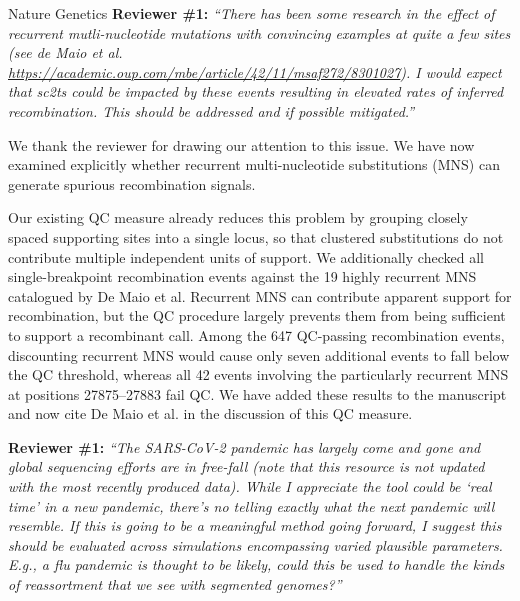 \documentclass{letter}
\begin{document}
\begin{letter}{Nature Genetics}
\noindent \textbf{Reviewer \#1:} \textit{``There has been some research in the effect
of recurrent mutli-nucleotide mutations with convincing examples at quite a
few sites (see de Maio et al.
\url{https://academic.oup.com/mbe/article/42/11/msaf272/8301027}). I would
expect that sc2ts could be impacted by these events resulting in elevated
rates of inferred recombination. This should be addressed and if possible
mitigated.''}

We thank the reviewer for drawing our attention to this issue. We have now
examined explicitly whether recurrent multi-nucleotide substitutions (MNS) can
generate spurious recombination signals.

Our existing QC measure already reduces this problem by grouping closely spaced
supporting sites into a single locus, so that clustered substitutions do not
contribute multiple independent units of support. We additionally checked all
single-breakpoint recombination events against the 19 highly recurrent MNS
catalogued by De Maio et al. Recurrent MNS can contribute apparent support for
recombination, but the QC procedure largely prevents them from being sufficient
to support a recombinant call. Among the 647 QC-passing recombination events,
discounting recurrent MNS would cause only seven additional events to fall
below the QC threshold, whereas all 42 events involving the particularly
recurrent MNS at positions 27875--27883 fail QC. We have added these results to
the manuscript and now cite De Maio et al. in the discussion of this QC
measure.

\noindent \textbf{Reviewer \#1:} \textit{``The SARS-CoV-2 pandemic has largely come and
gone and global sequencing efforts are in free-fall (note that this resource
is not updated with the most recently produced data). While I appreciate the
tool could be `real time' in a new pandemic, there's no telling exactly what
the next pandemic will resemble. If this is going to be a meaningful method
going forward, I suggest this should be evaluated across simulations
encompassing varied plausible parameters. E.g., a flu pandemic is thought to
be likely, could this be used to handle the kinds of reassortment that we see
with segmented genomes?''}


\end{letter}
\end{document}
